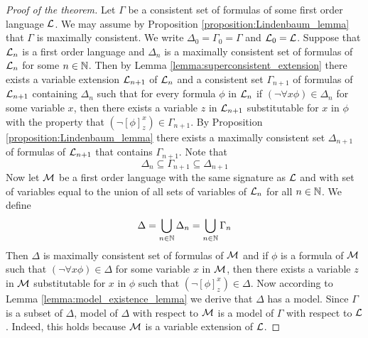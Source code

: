 \begin{proof}[Proof of the theorem]
Let $\Gamma$ be a consistent set of formulas of some first order language ${\mathcal L}$. We may assume by Proposition \ref{proposition:Lindenbaum_lemma} that $\Gamma$ is maximally consistent. We write $\Delta_0 = \Gamma_0 = \Gamma$ and ${\mathcal L}_0 = {\mathcal L}$. Suppose that ${\mathcal L}_n$ is a first order language and $\Delta_n$ is a maximally consistent set of formulas of ${\mathcal L}_n$ for some $n\in {\mathbb N}$. Then by Lemma \ref{lemma:superconsistent_extension} there exists a variable extension ${\mathcal L}_{n+1}$ of ${\mathcal L}_n$ and a consistent set $\Gamma_{n+1}$ of formulas of ${\mathcal L}_{n+1}$ containing $\Delta_n$ such that for every formula $\phi$ in ${\mathcal L}_n$ if $(\neg\forall x\phi) \in \Delta_n$ for some variable $x$, then there exists a variable $z$ in ${\mathcal L}_{n+1}$ substitutable for $x$ in $\phi$ with the property that $(\neg[\phi]^x_z) \in \Gamma_{n+1}$. By Proposition \ref{proposition:Lindenbaum_lemma} there exists a maximally consistent set $\Delta_{n+1}$ of formulas of ${\mathcal L}_{n+1}$ that contains $\Gamma_{n+1}$. Note that
$$\Delta_n \subseteq \Gamma_{n+1} \subseteq \Delta_{n+1}$$
Now let ${\mathcal M}$ be a first order language with the same signature as ${\mathcal L}$ and with set of variables equal to the union of all sets of variables of ${\mathcal L}_n$ for all $n\in {\mathbb N}$. We define
$$\Delta = \bigcup_{n\in {\mathbb N}} \Delta_n = \bigcup_{n\in {\mathbb N}} \Gamma_n$$
Then $\Delta$ is maximally consistent set of formulas of ${\mathcal M}$ and if $\phi$ is a formula of ${\mathcal M}$ such that $(\neg\forall x\phi) \in
\Delta$ for some variable $x$ in ${\mathcal M}$, then there exists a variable $z$ in ${\mathcal M}$ substitutable for $x$ in $\phi$ such that $(\neg[\phi]^x_z) \in \Delta$. Now according to Lemma \ref{lemma:model_existence_lemma} we derive that $\Delta$ has a model. Since $\Gamma$ is a subset of $\Delta$, model of $\Delta$ with respect to ${\mathcal M}$ is a model of $\Gamma$ with respect to ${\mathcal L}$. Indeed, this holds because ${\mathcal M}$ is a variable extension of ${\mathcal L}$.
\end{proof}


 



























\small





